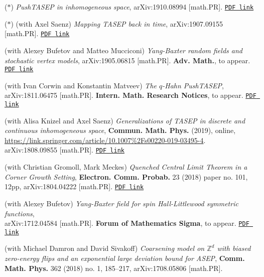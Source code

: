 \documentclass[letterpaper,11pt]{article}
\begin{document}
\begin{etaremune}
	\renewcommand{\labelenumi}{[\theenumi]}
	\item ($*$)
		\emph{PushTASEP in inhomogeneous space},
		arXiv:1910.08994 [math.PR].
		\href{https://storage.lpetrov.cc/research_files/Petrov-publ/33-publ-petrov-uva.pdf}{\texttt{PDF link}}	
	\item ($*$)
		(with Axel Saenz)
		\emph{Mapping TASEP back in time},
		arXiv:1907.09155 [math.PR].
		\href{https://storage.lpetrov.cc/research_files/Petrov-publ/32-publ-petrov-uva.pdf}{\texttt{PDF link}}	
\item 
	(with Alexey Bufetov and Matteo Mucciconi)
	\emph{Yang-Baxter random fields and stochastic vertex models},
	arXiv:1905.06815 [math.PR].
	\textbf{Adv. Math.}, to appear.
	\href{https://storage.lpetrov.cc/research_files/Petrov-publ/31-publ-petrov-uva.pdf}{\texttt{PDF link}}	
\item 
	(with Ivan Corwin and Konstantin Matveev)
	\emph{The $q$-Hahn PushTASEP},
	arXiv:1811.06475 [math.PR].
	\textbf{Intern. Math. Research Notices}, to appear.
		\href{https://storage.lpetrov.cc/research_files/Petrov-publ/30-publ-petrov-uva.pdf}{\texttt{PDF link}}	
\item 
	(with Alisa Knizel and
		Axel Saenz)
		\emph{Generalizations of TASEP in discrete and continuous inhomogeneous space},
		\textbf{Commun. Math. Phys.} (2019), online, \url{https://link.springer.com/article/10.1007%2Fs00220-019-03495-4}.
		arXiv:1808.09855 [math.PR].
		\href{https://storage.lpetrov.cc/research_files/Petrov-publ/29-publ-petrov-uva.pdf}{\texttt{PDF link}}
\item (with Christian Gromoll, Mark Meckes)
		\emph{Quenched Central Limit Theorem in a Corner Growth Setting},
		\textbf{Electron. Comm. Probab.} 23 (2018) paper no. 101, 12pp,
		arXiv:1804.04222 [math.PR]. 
		\href{https://storage.lpetrov.cc/research_files/Petrov-publ/28-publ-petrov-uva.pdf}{\texttt{PDF link}}
	
	\item (with Alexey Bufetov)
		\emph{Yang-Baxter field for spin Hall-Littlewood symmetric functions},\\
		arXiv:1712.04584 [math.PR]. \textbf{Forum of Mathematics Sigma}, to appear.
		\href{https://storage.lpetrov.cc/research_files/Petrov-publ/27-publ-petrov-uva.pdf}{\texttt{PDF link}}
	\item
	      (with Michael Damron and David Sivakoff) \emph{Coarsening model
		      on $\mathbb{Z}^d$ with biased zero-energy flips and an exponential large
			deviation bound for ASEP}, 
			\textbf{Comm. Math. Phys.} 362 (2018) no. 1, 185–217, 
			arXiv:1708.05806 [math.PR].
					

\end{etaremune}
\end{document}
